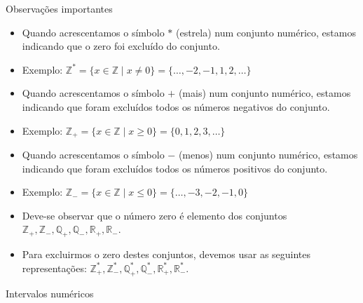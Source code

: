 \documentclass[14pt, aspectratio=169]{beamer}
\newcommand{\R}{\mathbb{R}}
\newcommand{\Q}{\mathbb{Q}}
\newcommand{\Z}{\mathbb{Z}}
\begin{document}
\begin{frame}[allowframebreaks]{Observações importantes}

\begin{itemize}
    \item Quando acrescentamos o símbolo $*$ (estrela) num conjunto numérico, estamos indicando que o zero foi excluído do conjunto. 
    
    \item Exemplo: $\Z^* = \{ x \in \Z \mid x \neq 0 \} = \{ \ldots, -2, -1, 1, 2, \ldots \}$
    
    \vspace{5.0cm}
    
    \item Quando acrescentamos o símbolo $+$ (mais) num conjunto numérico, estamos indicando que foram excluídos todos os números negativos do conjunto.

    \item Exemplo: $\Z_+ = \{ x \in \Z \mid x \geq 0 \} = \{0, 1, 2, 3, \ldots \}$

    \vspace{5.0cm}
    
    \item Quando acrescentamos o símbolo $-$ (menos) num conjunto numérico, estamos indicando que foram excluídos todos os números positivos do conjunto.

    \item Exemplo: $\Z_- = \{ x \in \Z \mid x \leq 0 \} = \{\ldots, -3, -2, -1, 0 \}$

    \vspace{5.0cm}
    
    \item Deve-se observar que o número zero é elemento dos conjuntos $\Z_+, \Z_-, \Q_+, \Q_-, \R_+, \R_-$.

    \item Para excluirmos o zero destes conjuntos, devemos usar as seguintes representações: $\Z_+^*, \Z_-^*, \Q_+^*, \Q_-^*, \R_+^*, \R_-^*$.
    
\end{itemize}
    
\end{frame}

\begin{frame}[allowframebreaks]{Intervalos numéricos}
        
\end{frame}
\end{document}
